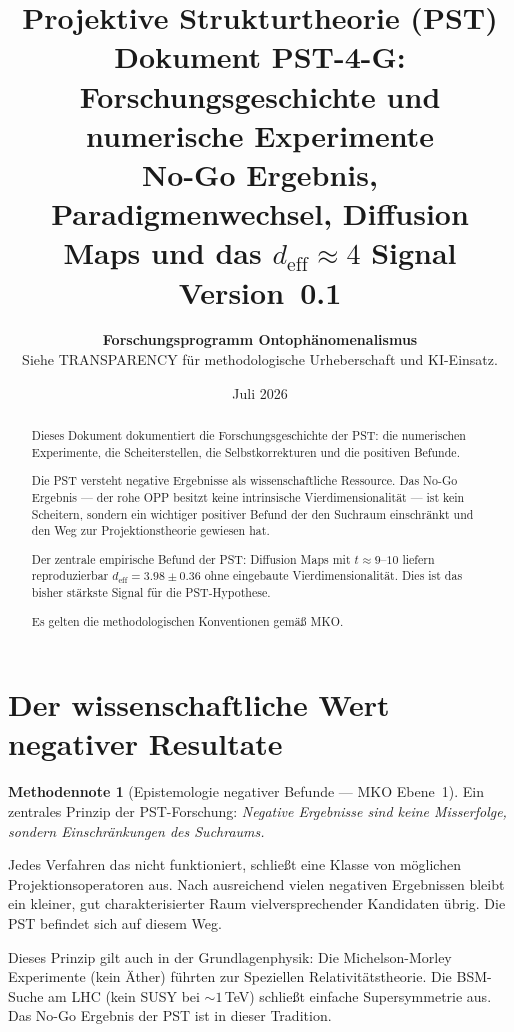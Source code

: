 \documentclass[11pt,a4paper]{article}
\title{
  \textbf{Projektive Strukturtheorie (PST)}\\[0.4em]
  \textbf{Dokument PST-4-G: Forschungsgeschichte und
  numerische Experimente}\\[0.4em]
  {\large No-Go Ergebnis, Paradigmenwechsel, Diffusion Maps
  und das $d_{\mathrm{eff}} \approx 4$ Signal}\\[0.5em]
  {\normalsize Version~0.1}
}
\author{
  \textbf{Forschungsprogramm Ontoph\"{a}nomenalismus}\\
  \small Siehe TRANSPARENCY f\"{u}r methodologische Urheberschaft
  und KI-Einsatz.
}
\date{Juli 2026}
\theoremstyle{plain}
\theoremstyle{definition}
\newtheorem{methodennote}{Methodennote}[section]
\newcommand{\deff}{d_{\mathrm{eff}}}
\begin{document}
\maketitle

\begin{abstract}
Dieses Dokument dokumentiert die Forschungsgeschichte der PST:
die numerischen Experimente, die Scheiterstellen, die Selbstkorrekturen
und die positiven Befunde.

Die PST versteht negative Ergebnisse als wissenschaftliche Ressource.
Das No-Go Ergebnis --- der rohe OPP besitzt keine intrinsische
Vierdimensionalit\"{a}t --- ist kein Scheitern, sondern ein wichtiger
positiver Befund der den Suchraum einschr\"{a}nkt und den Weg zur
Projektionstheorie gewiesen hat.

Der zentrale empirische Befund der PST: Diffusion Maps mit $t \approx 9$--$10$
liefern reproduzierbar $\deff = 3.98 \pm 0.36$ ohne eingebaute
Vierdimensionalit\"{a}t. Dies ist das bisher st\"{a}rkste Signal f\"{u}r die
PST-Hypothese.

Es gelten die methodologischen Konventionen gem\"{a}\ss{} MKO.
\end{abstract}

\tableofcontents
\newpage

\section{Der wissenschaftliche Wert negativer Resultate}

\begin{methodennote}[Epistemologie negativer Befunde --- MKO Ebene~1]
Ein zentrales Prinzip der PST-Forschung: \emph{Negative Ergebnisse
sind keine Misserfolge, sondern Einschr\"{a}nkungen des Suchraums.}

Jedes Verfahren das nicht funktioniert, schlie\ss{}t eine Klasse von
m\"{o}glichen Projektionsoperatoren aus. Nach ausreichend vielen negativen
Ergebnissen bleibt ein kleiner, gut charakterisierter Raum
vielversprechender Kandidaten \"{u}brig. Die PST befindet sich auf
diesem Weg.

Dieses Prinzip gilt auch in der Grundlagenphysik: Die Michelson-Morley
Experimente (kein \"{A}ther) f\"{u}hrten zur Speziellen Relativit\"{a}tstheorie.
Die BSM-Suche am LHC (kein SUSY bei $\sim 1$\,TeV) schlie\ss{}t einfache
Supersymmetrie aus. Das No-Go Ergebnis der PST ist in dieser Tradition.
\end{methodennote}
\end{document}
